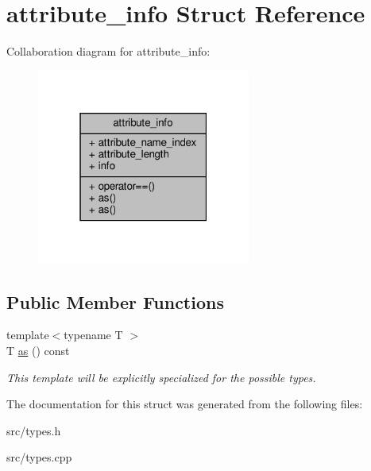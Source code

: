 \hypertarget{structattribute__info}{}\section{attribute\+\_\+info Struct Reference}
\label{structattribute__info}


Collaboration diagram for attribute\+\_\+info\+:
\nopagebreak
\begin{figure}[H]
\begin{center}
\leavevmode
\includegraphics[width=199pt]{structattribute__info__coll__graph}
\end{center}
\end{figure}
\subsection*{Public Member Functions}
\begin{DoxyCompactItemize}
\item 
\mbox{\label{structattribute__info_ace33b133435450d7d161751a3393de11}} 
{\footnotesize template$<$typename T $>$ }\\T \hyperlink{structattribute__info_ace33b133435450d7d161751a3393de11}{as} () const
\begin{DoxyCompactList}\small\item\em This template will be explicitly specialized for the possible types. \end{DoxyCompactList}\end{DoxyCompactItemize}


The documentation for this struct was generated from the following files\+:\begin{DoxyCompactItemize}
\item 
src/types.\+h\item 
src/types.\+cpp\end{DoxyCompactItemize}
